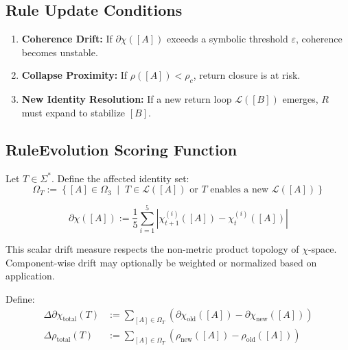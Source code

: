 \subsection{Rule Update Conditions} \label{rule-update-conditions}

\begin{enumerate}
  \item \textbf{Coherence Drift:} If $\partial \chi([A])$ exceeds a symbolic threshold $\varepsilon$, coherence becomes unstable.
  \item \textbf{Collapse Proximity:} If $\rho([A]) < \rho_c$, return closure is at risk.
  \item \textbf{New Identity Resolution:} If a new return loop $\mathcal{L}([B])$ emerges, $R$ must expand to stabilize $[B]$.
\end{enumerate}

\subsection{RuleEvolution Scoring Function} \label{ruleevolution-scoring-function}

Let $T \in \Sigma^*$. Define the affected identity set:
\begin{equation} \label{eq:affected-set}
\Omega_T := \left\{ [A] \in \Omega_3 \;\middle|\; T \in \mathcal{L}([A]) \text{ or } T \text{ enables a new } \mathcal{L}([A]) \right\}
\end{equation}

\begin{definition} \label{def:scalar-drift}
\begin{equation} \label{eq:drift-metric}
\partial \chi([A]) := \frac{1}{5} \sum_{i=1}^{5} \left| \chi_{t+1}^{(i)}([A]) - \chi_t^{(i)}([A]) \right|
\end{equation}
\end{definition}

This scalar drift measure respects the non-metric product topology of $\chi$-space.  
Component-wise drift may optionally be weighted or normalized based on application.

Define:
\begin{align}
\Delta \partial \chi_{\text{total}}(T) &:= \sum_{[A] \in \Omega_T} \left( \partial \chi_{\text{old}}([A]) - \partial \chi_{\text{new}}([A]) \right) \label{eq:delta-drift} \\
\Delta \rho_{\text{total}}(T) &:= \sum_{[A] \in \Omega_T} \left( \rho_{\text{new}}([A]) - \rho_{\text{old}}([A]) \right) \label{eq:delta-rho}
\end{align}

